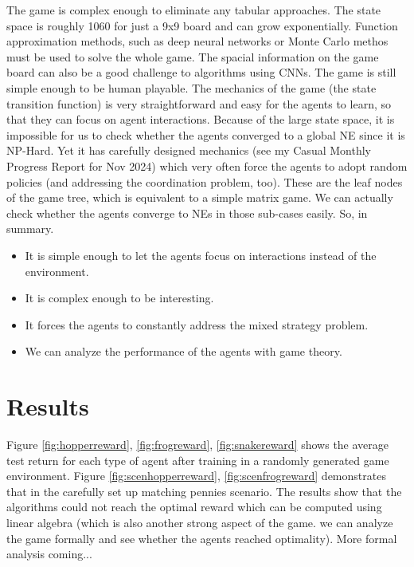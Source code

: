 \documentclass[a4paper]{article}
\begin{document}
\begin{multicols}{2}
The game is complex enough to eliminate any tabular approaches. The state space is roughly 1060 for just a 9x9 board and can grow exponentially. Function approximation methods, such as deep neural networks or Monte Carlo methos must be used to solve the whole game. The spacial information on the game board can also be a good challenge to algorithms using CNNs. The game is still simple enough to be human playable. The mechanics of the game (the state transition function) is very straightforward and easy for the agents to learn, so that they can focus on agent interactions. Because of the large state space, it is impossible for us to check whether the agents converged to a global NE since it is NP-Hard. Yet it has carefully designed mechanics (see my Casual Monthly Progress Report for Nov 2024) which very often force the agents to adopt random policies (and addressing the coordination problem, too). These are the leaf nodes of the game tree, which is equivalent to a simple matrix game. We can actually check whether the agents converge to NEs in those sub-cases easily. So, in summary.
\begin{itemize}
    \item It is simple enough to let the agents focus on interactions instead of the environment.
    \item It is complex enough to be interesting.
    \item It forces the agents to constantly address the mixed strategy problem.
    \item We can analyze the performance of the agents with game theory.
\end{itemize}

\section{Results}
Figure \ref{fig:hopperreward}, \ref{fig:frogreward}, \ref{fig:snakereward} shows the average test return for each type of agent after training in a randomly generated game environment. Figure \ref{fig:scenhopperreward}, \ref{fig:scenfrogreward} demonstrates that in the carefully set up matching pennies scenario. The results show that the algorithms could not reach the optimal reward which can be computed using linear algebra (which is also another strong aspect of the game. we can analyze the game formally and see whether the agents reached optimality). More formal analysis coming...

\noindent
\begin{minipage}{\columnwidth}
\centering

\label{fig:hopperreward}
\end{minipage}


\end{multicols}
\end{document}
